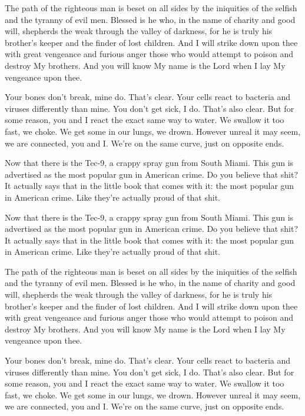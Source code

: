 \documentclass[11pt,twoside,a5paper,landscape,openright]{book}
\begin{document}
The path of the righteous man is beset on all sides by the iniquities of the selfish and the tyranny of evil men. Blessed is he who, in the name of charity and good will, shepherds the weak through the valley of darkness, for he is truly his brother's keeper and the finder of lost children. And I will strike down upon thee with great vengeance and furious anger those who would attempt to poison and destroy My brothers. And you will know My name is the Lord when I lay My vengeance upon thee.

Your bones don't break, mine do. That's clear. Your cells react to bacteria and viruses differently than mine. You don't get sick, I do. That's also clear. But for some reason, you and I react the exact same way to water. We swallow it too fast, we choke. We get some in our lungs, we drown. However unreal it may seem, we are connected, you and I. We're on the same curve, just on opposite ends.

Now that there is the Tec-9, a crappy spray gun from South Miami. This gun is advertised as the most popular gun in American crime. Do you believe that shit? It actually says that in the little book that comes with it: the most popular gun in American crime. Like they're actually proud of that shit. 

Now that there is the Tec-9, a crappy spray gun from South Miami. This gun is advertised as the most popular gun in American crime. Do you believe that shit? It actually says that in the little book that comes with it: the most popular gun in American crime. Like they're actually proud of that shit. 

The path of the righteous man is beset on all sides by the iniquities of the selfish and the tyranny of evil men. Blessed is he who, in the name of charity and good will, shepherds the weak through the valley of darkness, for he is truly his brother's keeper and the finder of lost children. And I will strike down upon thee with great vengeance and furious anger those who would attempt to poison and destroy My brothers. And you will know My name is the Lord when I lay My vengeance upon thee.

Your bones don't break, mine do. That's clear. Your cells react to bacteria and viruses differently than mine. You don't get sick, I do. That's also clear. But for some reason, you and I react the exact same way to water. We swallow it too fast, we choke. We get some in our lungs, we drown. However unreal it may seem, we are connected, you and I. We're on the same curve, just on opposite ends.
\end{document}
